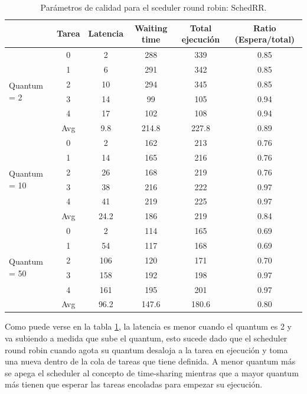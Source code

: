  \begin{table}[h!]
 	\begin{center}
 		\caption{Parámetros de calidad para el sceduler round robin: SchedRR.}
 		\label{tab:table1}
 		\begin{tabular}{|l|c|c|c|c|c|}
 			\hline
 			& Tarea & Latencia & Waiting time & Total ejecución & Ratio (Espera/total) \\
 			\hline
 			\hline
 			\multirow{6}{*}{Quantum = 2}
 			& 0 & 2 & 288 & 339 & 0.85\\ \cline{2-6}
 			& 1 & 6 & 291 & 342 & 0.85 \\ \cline{2-6}
 			& 2 & 10 & 294 & 345 & 0.85 \\ \cline{2-6}
 			& 3 & 14 & 99 & 105 & 0.94 \\ \cline{2-6}
 			& 4 & 17 & 102 & 108 & 0.94 \\ \cline{2-6}
 			& Avg & 9.8 & 214.8 & 227.8 & 0.89 \\
 			\hline
 			\hline
 			\multirow{6}{*}{Quantum = 10}
 			& 0 & 2 & 162 & 213 & 0.76 \\ \cline{2-6}
 			& 1 & 14 & 165 & 216 & 0.76 \\ \cline{2-6}
			& 2 & 26 & 168 & 219 & 0.76 \\ \cline{2-6}
 			& 3 & 38 & 216 & 222 & 0.97 \\ \cline{2-6}
 			& 4 & 41 & 219 & 225 & 0.97 \\ \cline{2-6}
 			& Avg & 24.2 & 186 & 219 & 0.84 \\
 			\hline
 			\hline
 			\multirow{6}{*}{Quantum = 50}
 			& 0 & 2 & 114 & 165 & 0.69 \\ \cline{2-6}
 			& 1 & 54 & 117 & 168 & 0.69 \\ \cline{2-6}
			& 2 & 106 & 120 & 171 & 0.70\\ \cline{2-6}
 			& 3 & 158 & 192 & 198 & 0.97 \\ \cline{2-6}
 			& 4 & 161 & 195 & 201 & 0.97 \\ \cline{2-6}
 			& Avg & 96.2 & 147.6 & 180.6 & 0.80 \\
 			\hline
 		\end{tabular}
 	\end{center}
 \end{table}

Como puede verse en la tabla \ref{tab:table1}, la latencia es menor cuando el quantum es 2 y va subiendo a medida que sube el quantum, esto sucede dado que el scheduler round robin cuando agota su quantum desaloja a la tarea en ejecución y toma una nueva dentro de la cola de tareas que tiene definida. A menor quantum más se apega el scheduler al concepto de time-sharing mientras que a mayor quantum más tienen que esperar las tareas encoladas para empezar su ejecución.

